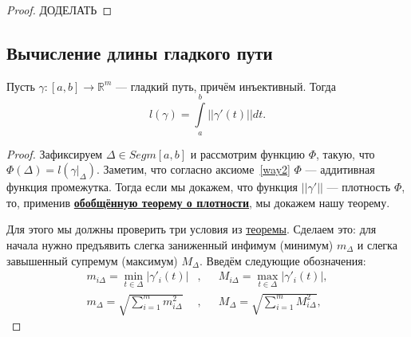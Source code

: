 \begin{proof}
	ДОДЕЛАТЬ
\end{proof}

\subsection{Вычисление длины гладкого пути}

\begin{theorem}
	Пусть \(\gamma \colon [a, b] \to \mathbb{R}^m\) --- гладкий путь, причём инъективный. Тогда \[
		l(\gamma) = \int\limits_a^b ||\gamma'(t)|| dt.
	\]
\end{theorem}

\begin{proof}
	Зафиксируем \(\Delta \in Segm [a, b]\) и рассмотрим функцию \(\Phi\), такую, что \(\Phi(\Delta) = l(\gamma |_\Delta)\). Заметим, что согласно аксиоме~\ref{way2} \(\Phi\) --- аддитивная функция промежутка. Тогда если мы докажем, что функция \(||\gamma'||\) --- плотность \(\Phi\), то, применив \hyperlink{plotn}{\bfseries обобщённую теорему о плотности}, мы докажем нашу теорему.
	
	Для этого мы должны проверить три условия из \hyperlink{plotn}{теоремы}. Сделаем это: для начала нужно предъявить слегка заниженный инфимум (минимум) \(m_\Delta\) и слегка завышенный супремум (максимум) \(M_\Delta\). Введём следующие обозначения:
	\begin{align*}
		m_{i\Delta} = \min\limits_{t \in \Delta} |\gamma'_i (t)|&, &&M_{i\Delta} = \max\limits_{t \in \Delta} |\gamma'_i (t)|, \\
		m_\Delta = \sqrt{\sum\limits_{i = 1}^m m_{i\Delta}^2}&, &&M_\Delta = \sqrt{\sum\limits_{i = 1}^m M_{i\Delta}^2},
	\end{align*}
	

\end{proof}
